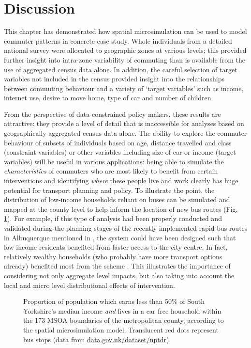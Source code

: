 \section{Discussion}
\label{discuss-jtrg}
This chapter has demonstrated how spatial microsimulation can be
used to model commuter patterns in concrete case study.
Whole individuals from a detailed national survey were
allocated to geographic zones at various levels; this provided further insight
into intra-zone variability of commuting than is available from the use of
aggregated census data alone. In addition, the careful selection of target
variables not included in the census provided insight into the relationships
between commuting behaviour and a variety of `target variables' such as income,
internet use, desire to move home, type of car and number of children.

From the perspective of data-constrained policy makers, these results are attractive:
they provide a level of detail that is inaccessible for analyses
based on geographically aggregated census data alone. The ability
to explore the commuter behaviour of subsets of individuals based on age,
distance travelled and class (constraint variables) or other variables
including size of car or income (target variables) will be useful in
various applications:
being able to simulate the \emph{characteristics} of commuters who are most
likely to benefit from certain interventions and identifying \emph{where} these
people live and work clearly has huge potential for transport planning and policy.
To illustrate the point, the
distribution of low-income households reliant on buses can be simulated and mapped
at the county level to help inform the location of new bus routes (Fig.
\ref{fig:busmap}). For example, if this type of analysis had been properly
conducted and validated during the planning stages of the recently implemented
rapid bus routes in Albuquerque mentioned in \citet{Tribby2012},
the system could have been
designed such that low income residents benefited from faster access to the city
centre. In fact, relatively wealthy households (who probably have more transport
options already) benefited most from the scheme \citep{Tribby2012}. This
illustrates the importance of considering not only aggregate level impacts, but
also taking into account the local and micro level distributional effects of
intervention.

\begin{figure}[h*]
 \centering
 \caption[Low-income car-free families and bus-stops in South Yorkshire]
 {Proportion of population which earns less than 50\% of South
Yorkshire's median income \emph{and} lives in a car free household within the 173 MSOA
boundaries of the metropolitan county, according to the spatial
microsimulation model. Translucent red dots represent bus
stops (data from {\color{blue}\href{http://data.gov.uk/dataset/nptdr}{data.gov.uk/dataset/nptdr}}).}
 \label{fig:busmap}
\end{figure}


